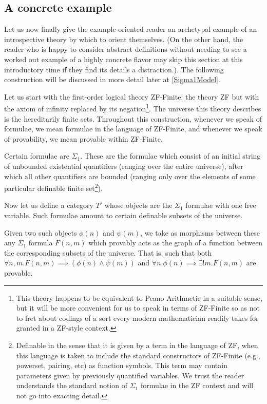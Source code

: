 \subsection{A concrete example}

\begin{construction}\label{SigmaModelSimple}
Let us now finally give the example-oriented reader an archetypal example of an introspective theory by which to orient themselves. (On the other hand, the reader who is happy to consider abstract definitions without needing to see a worked out example of a highly concrete flavor may skip this section at this introductory time if they find its details a distraction.). The following construction will be discussed in more detail later at \cref{Sigma1Model}.
\end{construction}

Let us start with the first-order logical theory ZF-Finite: the theory ZF but with the axiom of infinity replaced by its negation\footnote{This theory happens to be equivalent to Peano Arithmetic in a suitable sense, but it will be more convenient for us to speak in terms of ZF-Finite so as not to fret about codings of a sort every modern mathematician readily takes for granted in a ZF-style context.}. The universe this theory describes is the hereditarily finite sets. Throughout this construction, whenever we speak of formulae, we mean formulae in the language of ZF-Finite, and whenever we speak of provability, we mean provable within ZF-Finite.

Certain formulae are $\Sigma_1$. These are the formulae which consist of an initial string of unbounded existential quantifiers (ranging over the entire universe), after which all other quantifiers are bounded (ranging only over the elements of some particular definable finite set\footnote{Definable in the sense that it is given by a term in the language of ZF, when this language is taken to include the standard constructors of ZF-Finite (e.g., powerset, pairing, etc) as function symbols. This term may contain parameters given by previously quantified variables. We trust the reader understands the standard notion of $\Sigma_1$ formulae in the ZF context and will not go into exacting detail.}).

Now let us define a category $T'$ whose objects are the $\Sigma_1$ formulae with one free variable. Such formulae amount to certain definable subsets of the universe.

Given two such objects $\phi(n)$ and $\psi(m)$, we take as morphisms between these any $\Sigma_1$ formula $F(n, m)$ which provably acts as the graph of a function between the corresponding subsets of the universe. That is, such that both $\forall n, m . F(n, m) \implies (\phi(n) \wedge \psi(m))$ and $\forall n . \phi(n) \implies \exists! m . F(n, m)$ are provable.

